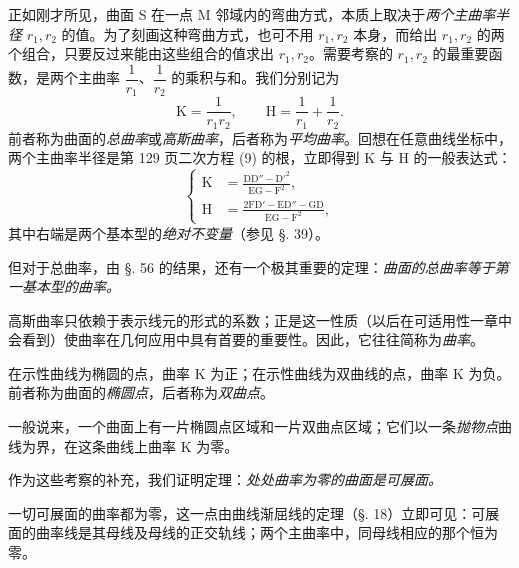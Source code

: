 正如刚才所见，曲面 S 在一点 M 邻域内的弯曲方式，本质上取决于\emph{两个主曲率半径} \(r_1,r_2\) 的值。为了刻画这种弯曲方式，也可不用 \(r_1,r_2\) 本身，而给出 \(r_1,r_2\) 的两个组合，只要反过来能由这些组合的值求出 \(r_1,r_2\)。需要考察的 \(r_1,r_2\) 的最重要函数，是两个主曲率 \(\dfrac{1}{r_1}\)、\(\dfrac{1}{r_2}\) 的乘积与和。我们分别记为
\[
\mathrm{K}=\frac{1}{r_1r_2}, \qquad \mathrm{H}=\frac{1}{r_1}+\frac{1}{r_2}.
\]
前者称为曲面的\emph{总曲率}或\emph{高斯曲率}，后者称为\emph{平均曲率}。回想在任意曲线坐标中，两个主曲率半径是第 129 页二次方程 (9) 的根，立即得到 K 与 H 的一般表达式：
\begin{equation}\tag{18}
\left\{
\begin{aligned}
\mathrm{K}&=\frac{\mathrm{D}\mathrm{D''}-\mathrm{D'}^2}{\mathrm{E}\mathrm{G}-\mathrm{F}^2},\\[0.4em]
\mathrm{H}&=\frac{2\mathrm{F}\mathrm{D'}-\mathrm{E}\mathrm{D''}-\mathrm{G}\mathrm{D}}{\mathrm{E}\mathrm{G}-\mathrm{F}^2},
\end{aligned}
\right.
\end{equation}
其中右端是两个基本型的\emph{绝对不变量}（参见 §. 39）。

但对于总曲率，由 §. 56 的结果，还有一个极其重要的定理：\emph{曲面的总曲率等于第一基本型的曲率。}

高斯曲率只依赖于表示线元的形式的系数；正是这一性质（以后在可适用性一章中会看到）使曲率在几何应用中具有首要的重要性。因此，它往往简称为\emph{曲率}。

在示性曲线为椭圆的点，曲率 K 为正；在示性曲线为双曲线的点，曲率 K 为负。前者称为曲面的\emph{椭圆点}，后者称为\emph{双曲点}。

一般说来，一个曲面上有一片椭圆点区域和一片双曲点区域；它们以一条\emph{抛物点}曲线为界，在这条曲线上曲率 K 为零。

作为这些考察的补充，我们证明定理：\emph{处处曲率为零的曲面是可展面。}

一切可展面的曲率都为零，这一点由曲线渐屈线的定理（§. 18）立即可见：可展面的曲率线是其母线及母线的正交轨线；两个主曲率中，同母线相应的那个恒为零。

